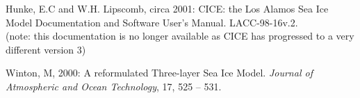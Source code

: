 \vspace{.2cm}

\noindent
Hunke, E.C and W.H. Lipscomb, circa 2001: CICE: the Los Alamos
Sea Ice Model Documentation and Software User's Manual.
LACC-98-16v.2.\\
(note: this documentation is no longer available as CICE has progressed
to a very different version 3)


\vspace{.2cm}

\noindent
Winton, M, 2000: A reformulated Three-layer Sea Ice Model.
{\it Journal of Atmospheric and Ocean Technology}, 17, 525 -- 531.



% 
